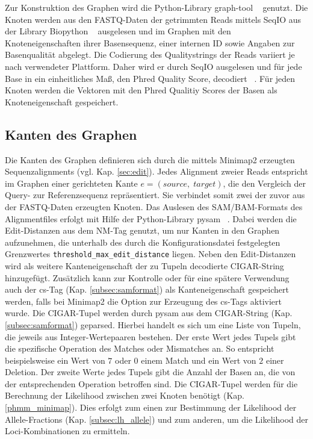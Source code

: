 Zur Konstruktion des Graphen wird die Python-Library graph-tool ~\cite{peixoto_2014} genutzt. Die Knoten werden aus den FASTQ-Daten der getrimmten Reads mittels SeqIO aus der Library Biopython ~\cite{cock_2009_1} ausgelesen und im Graphen mit den Knoteneigenschaften ihrer Basensequenz, einer internen ID sowie Angaben zur Basenqualität abgelegt. Die Codierung des Qualitystrings der Reads variiert je nach verwendeter Plattform. Daher wird er durch SeqIO ausgelesen und für jede Base in ein einheitliches Maß, den Phred Quality Score, decodiert ~\cite{cock_2009_2}.
Für jeden Knoten werden die Vektoren mit den Phred Qualitiy Scores der Basen als Knoteneigenschaft gespeichert. \\

\subsection{Kanten des Graphen} \label{subsec:edges}
Die Kanten des Graphen definieren sich durch die mittels Minimap2 erzeugten Sequenzalignments (vgl. Kap. \ref{sec:edit}). Jedes Alignment zweier Reads entspricht im Graphen einer gerichteten Kante $e = (source,\; target)$, die den Vergleich der Query- zur Referenzsequenz repräsentiert. Sie verbindet somit zwei der zuvor aus der FASTQ-Daten erzeugten Knoten. Das Auslesen des SAM/BAM-Formats des Alignmentfiles erfolgt mit Hilfe der Python-Library pysam ~\cite{pysam}. Dabei werden die Edit-Distanzen aus dem NM-Tag genutzt, um nur Kanten in den Graphen aufzunehmen, die unterhalb des durch die Konfigurationsdatei festgelegten Grenzwertes \lstinline|threshold_max_edit_distance| liegen. Neben den Edit-Distanzen wird als weitere Kanteneigenschaft der zu Tupeln decodierte CIGAR-String hinzugefügt. Zusätzlich kann zur Kontrolle oder für eine spätere Verwendung auch der cs-Tag (Kap. \ref{subsec:samformat}) als Kanteneigenschaft gespeichert werden, falls bei Minimap2 die Option zur Erzeugung des cs-Tags aktiviert wurde. Die CIGAR-Tupel werden durch pysam aus dem CIGAR-String (Kap. \ref{subsec:samformat}) geparsed. Hierbei handelt es sich um eine Liste von Tupeln, die jeweils aus Integer-Wertepaaren bestehen. Der erste Wert jedes Tupels gibt die spezifische Operation des Matches oder Mismatches an. So entspricht beispielsweise ein Wert von $ 7 $ oder $ 0 $ einem Match und ein Wert von $ 2 $ einer Deletion. Der zweite Werte jedes Tupels gibt die Anzahl der Basen an, die von der entsprechenden Operation betroffen sind. Die CIGAR-Tupel werden für die Berechnung der Likelihood zwischen zwei Knoten benötigt (Kap. \ref{phmm_minimap}). Dies erfolgt zum einen zur Bestimmung der Likelihood der Allele-Fractions (Kap. \ref{subsec:lh_allele}) und zum anderen, um die Likelihood der Loci-Kombinationen zu ermitteln. \\

